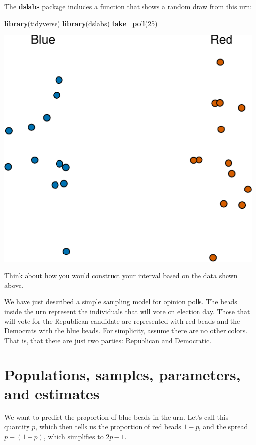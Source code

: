 \documentclass[openany]{book}
\newenvironment{Shaded}{\begin{snugshade}}{\end{snugshade}}
\newcommand{\DecValTok}[1]{\textcolor[rgb]{0.06,0.06,0.06}{#1}}
\newcommand{\KeywordTok}[1]{\textcolor[rgb]{0.27,0.27,0.27}{\textbf{#1}}}
\newcommand{\NormalTok}[1]{#1}
\begin{document}
The \textbf{dslabs} package includes a function that shows a random draw from this urn:

\begin{Shaded}
\begin{Highlighting}[]
\KeywordTok{library}\NormalTok{(tidyverse)}
\KeywordTok{library}\NormalTok{(dslabs)}
\KeywordTok{take_poll}\NormalTok{(}\DecValTok{25}\NormalTok{)}
\end{Highlighting}
\end{Shaded}

\begin{center}\includegraphics[width=0.7\linewidth]{dsbook_files/figure-latex/first-simulated-poll-1} \end{center}

Think about how you would construct your interval based on the data shown above.

We have just described a simple sampling model for opinion polls. The beads inside the urn represent the individuals that will vote on election day. Those that will vote for the Republican candidate are represented with red beads and the Democrats with the blue beads. For simplicity, assume there are no other colors. That is, that there are just two parties: Republican and Democratic.

\hypertarget{populations-samples-parameters-and-estimates}{%
\section{Populations, samples, parameters, and estimates}\label{populations-samples-parameters-and-estimates}}

We want to predict the proportion of blue beads in the urn. Let's call this quantity \(p\), which then tells us the proportion of red beads \(1-p\), and the spread \(p - (1-p)\), which simplifies to \(2p - 1\).
\end{document}
